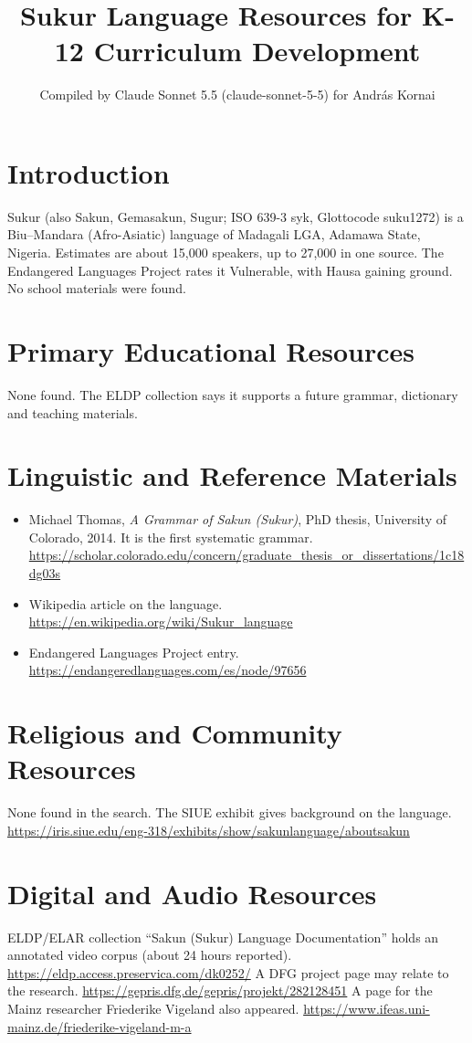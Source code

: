 \documentclass[12pt]{article}
\title{Sukur Language Resources for K-12 Curriculum Development}
\author{Compiled by Claude Sonnet 5.5 (claude-sonnet-5-5) for Andr\'as Kornai}
\date{}
\begin{document}
\maketitle

\section{Introduction}
Sukur (also Sakun, Gemasakun, Sugur; ISO 639-3 syk, Glottocode suku1272) is a Biu--Mandara (Afro-Asiatic) language of Madagali LGA, Adamawa State, Nigeria. Estimates are about 15,000 speakers, up to 27,000 in one source. The Endangered Languages Project rates it Vulnerable, with Hausa gaining ground. No school materials were found.

\section{Primary Educational Resources}
None found. The ELDP collection says it supports a future grammar, dictionary and teaching materials.

\section{Linguistic and Reference Materials}
\begin{itemize}
\item Michael Thomas, \emph{A Grammar of Sakun (Sukur)}, PhD thesis, University of Colorado, 2014. It is the first systematic grammar. \url{https://scholar.colorado.edu/concern/graduate_thesis_or_dissertations/1c18dg03s}
\item Wikipedia article on the language. \url{https://en.wikipedia.org/wiki/Sukur_language}
\item Endangered Languages Project entry. \url{https://endangeredlanguages.com/es/node/97656}
\end{itemize}

\section{Religious and Community Resources}
None found in the search. The SIUE exhibit gives background on the language. \url{https://iris.siue.edu/eng-318/exhibits/show/sakunlanguage/aboutsakun}

\section{Digital and Audio Resources}
ELDP/ELAR collection ``Sakun (Sukur) Language Documentation'' holds an annotated video corpus (about 24 hours reported). \url{https://eldp.access.preservica.com/dk0252/} A DFG project page may relate to the research. \url{https://gepris.dfg.de/gepris/projekt/282128451} A page for the Mainz researcher Friederike Vigeland also appeared. \url{https://www.ifeas.uni-mainz.de/friederike-vigeland-m-a}
\end{document}
